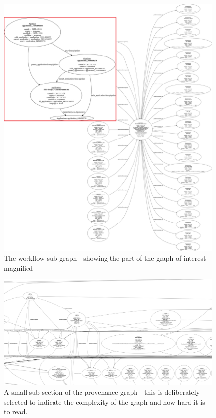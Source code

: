 \documentclass[runningheads]{llncs}
\begin{document}
\begin{figure} %
\includegraphics[width=\textwidth]{img/workflow.png}
\caption{The workflow sub-graph - showing the part of the graph of interest magnified} \label{fig:workflow} \end{figure}

\begin{figure}
\includegraphics[width=\textwidth]{img/subsection-of-provenance.png}
\caption{A small sub-section of the provenance graph - this is deliberately selected to indicate the complexity of the graph and how hard it is to read.} \label{fig:sub-provenance}
\end{figure}
\end{document}

